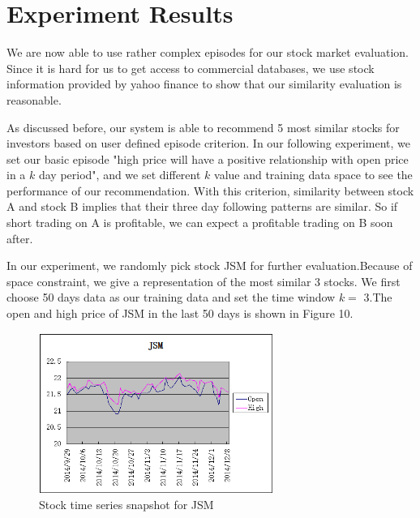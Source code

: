 \documentclass[10pt, conference, compsocconf]{IEEEtran}
\begin{document}
    
          

\section{Experiment Results}
We are now able to use rather complex episodes for our stock market evaluation. Since it is hard for us to get access to commercial databases, we use stock information  provided by yahoo finance to show that our similarity evaluation is reasonable.\\

\par 
As discussed before, our system is able to recommend 5 most similar stocks for investors based on user defined episode criterion. In our following experiment, we set our basic episode "high price will have a positive relationship with open price in a $k$ day period", and we set different $k$ value and training data space to see the performance of our recommendation. With this criterion, similarity between stock A and stock B implies that their three day following patterns are similar. So if short trading on A is profitable, we can expect a profitable trading on B soon after.\\
\par 
In our experiment, we randomly pick stock JSM for further evaluation.Because of space constraint, we give a representation of the most similar 3 stocks. We first choose 50 days data as our training data and set the time window $k=$ 3.The open and high price of JSM in the last 50 days is shown in Figure 10. \\
\par
\vspace{2mm}
 \begin{figure}[!h]
\includegraphics[width=3in]{figures/JSM}
\caption{Stock time series snapshot for JSM}
\vspace{2mm}
 \end{figure}
\par
\end{document}
